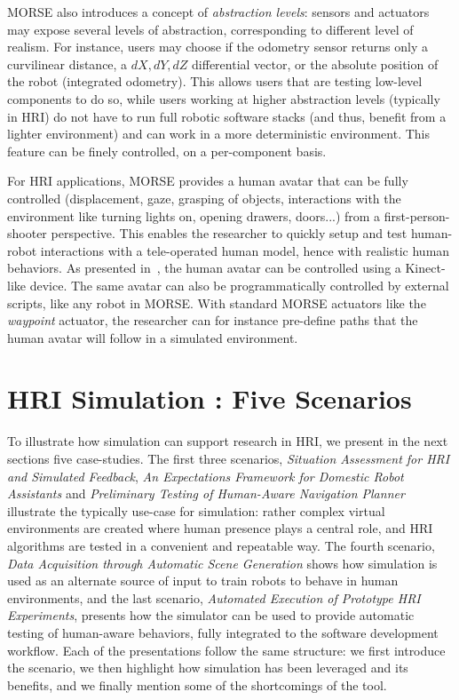 \documentclass{llncs}
\begin{document}
MORSE also introduces a concept of \emph{abstraction levels}: sensors and actuators
may expose several levels of abstraction, corresponding to different level of
realism. For instance, users may choose if the odometry sensor returns only a
curvilinear distance, a $dX, dY, dZ$ differential vector, or the absolute
position of the robot (integrated odometry). This allows users that are testing
low-level components to do so, while users working at higher abstraction
levels (typically in HRI) do not have to run full robotic software stacks (and
thus, benefit from a lighter environment) and can work in a more deterministic
environment. This feature can be finely controlled, on a per-component basis.

For HRI applications, MORSE provides a human avatar that can be fully controlled
(displacement, gaze, grasping of objects, interactions with the environment like
turning lights on, opening drawers, doors...) from a first-person-shooter perspective.
This enables the researcher to quickly setup and test human-robot interactions
with a tele-operated human model, hence with realistic human behaviors. As
presented in~\cite{lemaignan2012morse}, the human avatar can be controlled using
a Kinect-like device. The same avatar can also be programmatically controlled
by external scripts, like any robot in MORSE. With standard MORSE actuators like
the \emph{waypoint} actuator, the researcher can for instance pre-define paths
that the human avatar will follow in a simulated environment.

\section{HRI Simulation : Five Scenarios}

To illustrate how simulation can support research in HRI, we present in the next
sections five case-studies.  The first three scenarios, \emph{Situation
Assessment for HRI and Simulated Feedback}, \emph{An Expectations Framework for
Domestic Robot Assistants} and \emph{Preliminary Testing of Human-Aware
Navigation Planner} illustrate the typically use-case for simulation: rather
complex virtual environments are created where human presence plays a
central role, and HRI algorithms are tested in a convenient and repeatable way.
The fourth scenario, \emph{Data Acquisition through Automatic Scene Generation}
shows how simulation is used as an alternate source of input to train robots to
behave in human environments, and the last scenario, \emph{Automated Execution
of Prototype HRI Experiments}, presents how the simulator can be used to provide
automatic testing of human-aware behaviors, fully integrated to the software
development workflow. Each of the presentations follow the same structure: we
first introduce the scenario, we then highlight how simulation has been leveraged
and its benefits, and we finally mention some of the shortcomings of the tool.
\end{document}
